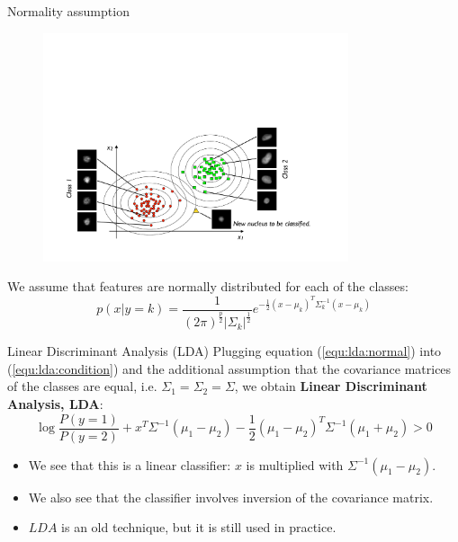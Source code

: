 \documentclass[xcolor=pdftex,dvipsnames,table]{beamer}
\begin{document}
\begin{frame}{Normality assumption}
\begin{figure}[htb]
\includegraphics[width=0.8\textwidth]{../graphics/LDA1.pdf}
\end{figure}
We assume that features are normally distributed for each of the classes:
\begin{equation}\label{equ:lda:normal}
p(x|y=k)=\frac{1}{(2\pi)^{\frac{p}{2}}|\Sigma_k|^{\frac{1}{2}}}e^{-\frac{1}{2}(x-\mu_k)^T\Sigma_k^{-1}(x-\mu_k)}
\end{equation}
\end{frame}

\begin{frame}{Linear Discriminant Analysis (LDA)}
Plugging equation (\ref{equ:lda:normal}) into (\ref{equ:lda:condition}) and the additional assumption that the covariance matrices of the classes are equal, i.e. $\Sigma_1 = \Sigma_2 = \Sigma$, we obtain {\bf Linear Discriminant Analysis, LDA}:
\begin{equation*}
\log{\frac{P(y=1)}{P(y=2)}} + x^T\Sigma^{-1}(\mu_1-\mu_2) - \frac{1}{2}(\mu_1-\mu_2)^T\Sigma^{-1}(\mu_1+\mu_2) > 0
\end{equation*}
\begin{itemize}
	\item We see that this is a linear classifier: $x$ is multiplied with $\Sigma^{-1}(\mu_1-\mu_2)$. 
	\item We also see that the classifier involves inversion of the covariance matrix. 
	\item $LDA$ is an old technique, but it is still used in practice. 
\end{itemize} 
\end{frame}
\end{document}
